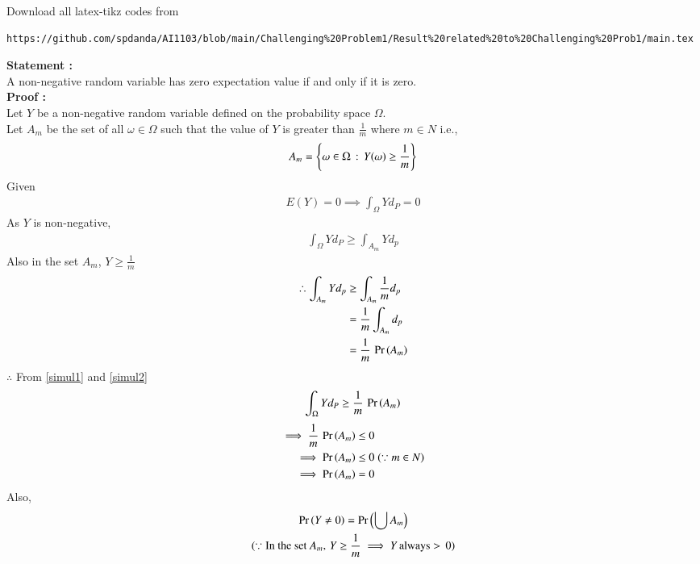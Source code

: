 \documentclass[journal,12pt,twocolumn]{IEEEtran}
\begin{document}
\author{Name: Sai Pravallika Danda, Roll Number: CS20BTECH11013}
\maketitle
\newpage
\bigskip
\renewcommand{\thefigure}{\theenumi}
\renewcommand{\thetable}{\theenumi}
Download all latex-tikz codes from 
%
\begin{lstlisting}
https://github.com/spdanda/AI1103/blob/main/Challenging%20Problem1/Result%20related%20to%20Challenging%20Prob1/main.tex
\end{lstlisting}
\large\textbf{Statement :}\\
A non-negative random variable has zero expectation value if and only if it is zero.\\
\textbf{Proof :}\\
Let $Y$ be a non-negative random variable defined on the probability space $\Omega$.\\
Let $A_m$ be the set of all $\omega \in \Omega$ such that the value of $Y$ is greater than $\frac{1}{m}$ where $m \in N$ i.e.,
$$A_m = \left\{\omega \in \Omega\,:\,Y(\omega) \geq \frac{1}{m}\right\}$$
Given
\begin{align}
    E(Y) =0 \implies \int_\Omega Yd_P =0
\end{align}
As $Y$ is non-negative,
\begin{align}
    \int_\Omega Yd_P \geq \int_{A_m}Yd_p \label{simul1}
\end{align}
Also in the set $A_m$, $Y \geq \frac{1}{m}$
\begin{align}
  \therefore \int_{A_m}Yd_p  &\geq  \int_{A_m}\frac{1}{m}d_p\\
                             &= \frac{1}{m}\int_{A_m}d_p\\
                             &= \frac{1}{m}\,\Pr\left(A_m\right) \label{simul2}
\end{align}
$\therefore$ From \eqref{simul1} and \eqref{simul2}
\begin{align}
  \int_\Omega Yd_P \geq \frac{1}{m}\,\Pr\left(A_m\right)
\end{align}
\begin{align}
    \implies \frac{1}{m}\,\Pr\left(A_m\right) &\leq 0\\
    \implies \Pr\left(A_m\right) &\leq 0\;(\because m \in N)\\
    \implies \Pr\left(A_m\right) &= 0
\end{align}
Also,
\begin{multline}
    \Pr\left(Y \neq 0\right) = \Pr\left(\bigcup A_m\right)\\(\because \text{In the set } A_m,\,Y \geq \frac{1}{m} \implies Y\,\text{always}> \,0)
\end{multline}
\end{document}
